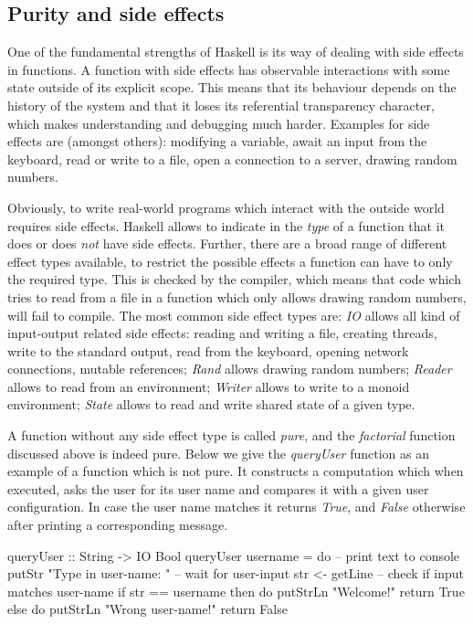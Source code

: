 \subsection{Purity and side effects}
\label{sec:purity_sideeffects}
One of the fundamental strengths of Haskell is its way of dealing with side effects in functions. A function with side effects has observable interactions with some state outside of its explicit scope. This means that its behaviour depends on the history of the system and that it loses its referential transparency character, which makes understanding and debugging much harder. Examples for side effects are (amongst others): modifying a variable, await an input from the keyboard, read or write to a file, open a connection to a server, drawing random numbers.

Obviously, to write real-world programs which interact with the outside world requires side effects. Haskell allows to indicate in the \textit{type} of a function that it does or does \textit{not} have side effects. Further, there are a broad range of different effect types available, to restrict the possible effects a function can have to only the required type. This is checked by the compiler, which means that code which tries to read from a file in a function which only allows drawing random numbers, will fail to compile. The most common side effect types are: \textit{IO} allows all kind of input-output related side effects: reading and writing a file, creating threads, write to the standard output, read from the keyboard, opening network connections, mutable references; \textit{Rand}  allows drawing random numbers; \textit{Reader} allows to read from an environment; \textit{Writer} allows to write to a monoid environment; \textit{State} allows to read and write shared state of a given type.

A function without any side effect type is called \textit{pure}, and the \textit{factorial} function discussed above is indeed pure. Below we give the \textit{queryUser} function as an example of a function which is not pure. It constructs a computation which when executed, asks the user for its user name and compares it with a given user configuration. In case the user name matches it returns \textit{True}, and \textit{False} otherwise after printing a corresponding message. 

\begin{HaskellCode}
queryUser :: String -> IO Bool
queryUser username = do
  -- print text to console
  putStr "Type in user-name: "
  -- wait for user-input
  str <- getLine
  -- check if input matches user-name
  if str == username
    then do
      putStrLn "Welcome!"			
      return True
    else do
      putStrLn "Wrong user-name!"
      return False
\end{HaskellCode}

